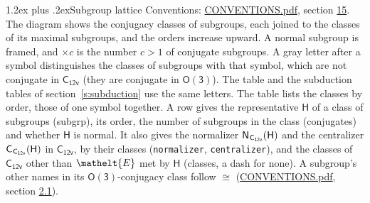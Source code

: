 \documentclass[10pt,a4paper]{article}
\makeatletter
\renewcommand\section{\@startsection{section}{1}{\z@}{-3ex plus -1ex minus -.2ex}%
  {1.2ex plus .2ex}{\normalfont\large\sffamily\bfseries\color{parttitle}}}
\numberwithin{equation}{section}
\newcommand{\eltfont}[1]{{\let\sigma\eltsigma\mathelt{#1}}}
\newcommand{\grp}[1]{\mathsf{#1}}
\newcommand{\cls}[1]{\eltfont{#1}}
\newcommand{\samecls}{\cong}
\newcommand{\hairsp}{\mkern1mu}
\makeatother
\begin{document}
\section{Subgroup lattice}\label{s:subgroups}
Conventions: \href{../../CONVENTIONS.pdf}{CONVENTIONS.pdf}, section \href{../../CONVENTIONS.pdf\#conv.15}{15}.
The diagram shows the conjugacy classes of subgroups, each joined to the classes of its maximal subgroups, and the orders increase upward. A normal subgroup is framed, and ${\times}c$ is the number $c > 1$ of conjugate subgroups. A gray letter after a symbol distinguishes the classes of subgroups with that symbol, which are not conjugate in $\grp{C_{12v}}$ (they are conjugate in \href{O3.pdf}{$\grp{O(3)}$}). The table and the subduction tables of section~\ref{s:subduction} use the same letters. The table lists the classes by order, those of one symbol together. \label{n:group.H}\label{n:head.subgroup}\label{n:head.order}\label{n:head.conjugates}\label{n:head.normal}A row gives the representative $\grp{H}$ of a class of subgroups (subgrp), its order, the number of subgroups in the class (conjugates) and whether $\grp{H}$ is normal. \label{n:group.normalizer}\label{n:group.centralizer}\label{n:head.classes}It also gives the normalizer $\grp{N}_{\hairsp \grp{C_{12v}}}(\grp{H})$ and the centralizer $\grp{C}_{\hairsp \grp{C_{12v}}}(\grp{H})$ in $\grp{C_{12v}}$, by their classes (\texttt{normalizer}, \texttt{centralizer}), and the classes of $\grp{C_{12v}}$ other than $\cls{E}$ met by $\grp{H}$ (classes, a dash for none). A subgroup's other names in its \href{O3.pdf}{$\grp{O(3)}$}-conjugacy class follow $\samecls$ (\href{../../CONVENTIONS.pdf}{CONVENTIONS.pdf}, section \href{../../CONVENTIONS.pdf\#conv.2.1}{2.1}).
\end{document}
